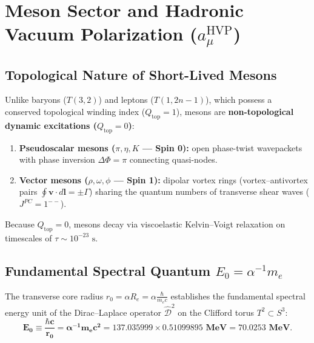 \documentclass[12pt,a4paper]{article}
\begin{document}
	\section{Meson Sector and Hadronic Vacuum Polarization ($a_\mu^{\text{HVP}}$)}
	
	\subsection{Topological Nature of Short-Lived Mesons}
	Unlike baryons ($T(3,2)$) and leptons ($T(1, 2n-1)$), which possess a conserved topological winding index ($Q_{\text{top}} = 1$), mesons are \textbf{non-topological dynamic excitations ($Q_{\text{top}} = 0$)}:
	\begin{enumerate}
		\item \textbf{Pseudoscalar mesons ($\pi, \eta, K$ --- Spin 0):} open phase-twist wavepackets with phase inversion $\Delta \Phi = \pi$ connecting quasi-nodes.
		\item \textbf{Vector mesons ($\rho, \omega, \phi$ --- Spin 1):} dipolar vortex rings (vortex--antivortex pairs $\oint \mathbf{v} \cdot d\mathbf{l} = \pm \Gamma$) sharing the quantum numbers of transverse shear waves ($J^{PC} = 1^{--}$).
	\end{enumerate}
	Because $Q_{\text{top}} = 0$, mesons decay via viscoelastic Kelvin--Voigt relaxation on timescales of $\tau \sim 10^{-23}\text{ s}$.
	
	\subsection{Fundamental Spectral Quantum $E_0 = \alpha^{-1} m_e$}
	The transverse core radius $r_0 = \alpha R_e = \alpha \frac{\hbar}{m_e c}$ establishes the fundamental spectral energy unit of the Dirac--Laplace operator $\hat{\mathcal{D}}^2$ on the Clifford torus $T^2 \subset S^3$:
	\begin{equation}
		\mathbf{E_0 \equiv \frac{\hbar c}{r_0} = \alpha^{-1} m_e c^2 = 137.035999 \times 0.51099895 \text{ MeV} = \mathbf{70.0253 \text{ MeV}}}.
	\end{equation}
	
\end{document}
